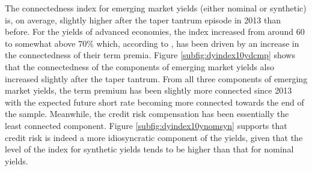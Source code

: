 \begin{appendices}
The connectedness index for emerging market yields (either nominal or synthetic) is, on average, slightly higher after the taper tantrum episode in 2013 than before. For the yields of advanced economies, the index increased from around 60 to somewhat above 70\% which, according to \cite{ACDM:2019}, has been driven by an increase in the connectedness of their term premia.
Figure \ref{subfig:dyindex10ydcmp} shows that the connectedness of the components of emerging market yields also increased slightly after the taper tantrum.
From all three components of emerging market yields, the term premium has been slightly more connected since 2013 with the expected future short rate becoming more connected towards the end of the sample. Meanwhile, the credit risk compensation has been essentially the least connected component.
Figure \ref{subfig:dyindex10ynomsyn} supports that credit risk is indeed a more idiosyncratic component of the yields, given that the level of the index for synthetic yields tends to be higher than that for nominal yields.


\end{appendices}
